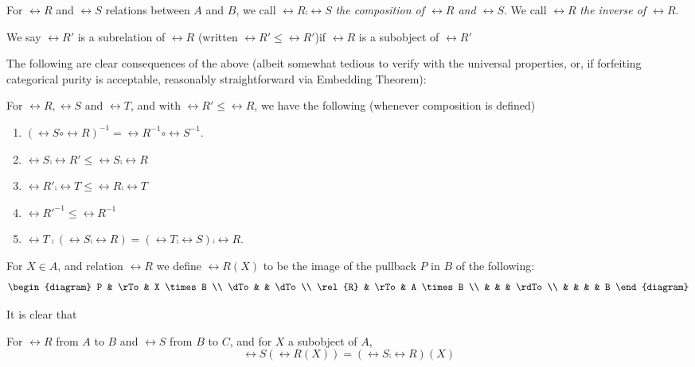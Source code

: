 \begin{definition}
For $\rel{R}$ and $\rel{S}$ relations between $A$ and $B$, we call
$\rel{R} \comp \rel{S}$ \emph{the composition of $\rel{R}$ and 
$\rel{S}$}. We call $\rel{R}$ \emph{the inverse of $\rel{R}$}.
\end{definition}

\begin{definition}
We say $\rel{R}'$ is a subrelation of $\rel{R}$ (written 
$\rel{R}' \leq \rel{R}'$)if $\rel{R}$ is a subobject of $\rel{R}'$
\end{definition}

The following are clear consequences of the above (albeit somewhat
tedious to verify with the universal properties, or, if forfeiting
categorical purity is acceptable, reasonably straightforward via 
Embedding Theorem):

\begin{prop}\label{prop_2_47}
For $\rel{R}, \rel{S}$ and $\rel{T}$, and with $\rel{R}' \leq 
\rel{R}$, we have the following (whenever composition is defined)
\begin{enumerate}
\item $(\rel{S} \circ \rel{R})^{-1} = \rel{R}^{-1} \circ 
\rel{S}^{-1}$.

\item $\rel{S} \comp \rel{R}' \leq \rel{S} \comp \rel{R}$

\item $\rel{R}' \comp \rel{T} \leq \rel{R} \comp \rel{T}$

\item $\rel{R}'^{-1} \leq \rel{R}^{-1}$

\item $\rel{T} \comp (\rel{S} \comp \rel{R}) = (\rel{T} \comp 
\rel{S}) \comp \rel{R}$.
\end{enumerate}
\end{prop}

For $X \in A$, and relation $\rel{R}$ we define $\rel{R}(X)$ to 
be the image of the pullback $P$ in $B$ of the following:
\[
\begin{diagram}
P & \rTo & X \times B \\
\dTo &   & \dTo \\
\rel{R} & \rTo & A \times B \\
    &  &  &  \rdTo \\
    &  &  &   & B
\end{diagram}
\]

It is clear that
\begin{prop}
For $\rel{R}$ from $A$ to $B$ and $\rel{S}$ from $B$ to $C$, and 
for $X$ a subobject of $A$,
\[
\rel{S}(\rel{R}(X)) = (\rel{S} \comp \rel{R})(X)
\]
\end{prop}

